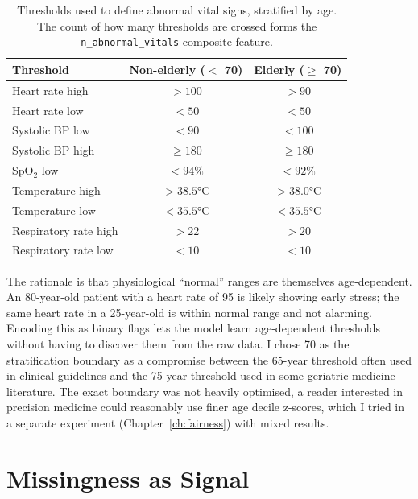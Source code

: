 \begin{table}[htbp]
 \centering
 \caption[Age-stratified vital abnormality thresholds]{Thresholds used to define abnormal vital signs, stratified by age. The count of how many thresholds are crossed forms the \texttt{n\_abnormal\_vitals} composite feature.}
 \label{tab:age-strat-thresholds}
 \small
 \begin{tabular}{lcc}
 \toprule
 Threshold & Non-elderly ($<$ 70) & Elderly ($\geq$ 70) \\
 \midrule
 Heart rate high & $> 100$ & $> 90$ \\
 Heart rate low & $< 50$ & $< 50$ \\
 Systolic BP low & $< 90$ & $< 100$ \\
 Systolic BP high & $\geq 180$ & $\geq 180$ \\
 SpO$_2$ low & $< 94\%$ & $< 92\%$ \\
 Temperature high & $> 38.5$°C & $> 38.0$°C \\
 Temperature low & $< 35.5$°C & $< 35.5$°C \\
 Respiratory rate high & $> 22$ & $> 20$ \\
 Respiratory rate low & $< 10$ & $< 10$ \\
 \bottomrule
 \end{tabular}
\end{table}

\begin{notebox}
The rationale is that physiological ``normal'' ranges are themselves age-dependent. An 80-year-old patient with a heart rate of 95 is likely showing early stress; the same heart rate in a 25-year-old is within normal range and not alarming. Encoding this as binary flags lets the model learn age-dependent thresholds without having to discover them from the raw data. I chose 70 as the stratification boundary as a compromise between the 65-year threshold often used in clinical guidelines and the 75-year threshold used in some geriatric medicine literature. The exact boundary was not heavily optimised, a reader interested in precision medicine could reasonably use finer age decile z-scores, which I tried in a separate experiment (Chapter~\ref{ch:fairness}) with mixed results.
\end{notebox}

\section{Missingness as Signal}

